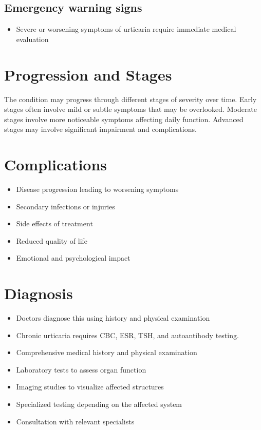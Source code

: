 \subsection{Emergency warning signs}
\begin{itemize}[noitemsep]
  \item Severe or worsening symptoms of urticaria require immediate medical evaluation
\end{itemize}
\section{Progression and Stages}
The condition may progress through different stages of severity over time. Early stages often involve mild or subtle symptoms that may be overlooked. Moderate stages involve more noticeable symptoms affecting daily function. Advanced stages may involve significant impairment and complications.
\section{Complications}
\begin{itemize}[noitemsep]
  \item Disease progression leading to worsening symptoms
  \item Secondary infections or injuries
  \item Side effects of treatment
  \item Reduced quality of life
  \item Emotional and psychological impact
\end{itemize}
\section{Diagnosis}
\begin{itemize}[noitemsep]
  \item Doctors diagnose this using history and physical examination
  \item Chronic urticaria requires CBC, ESR, TSH, and autoantibody testing.
  \item Comprehensive medical history and physical examination
  \item Laboratory tests to assess organ function
  \item Imaging studies to visualize affected structures
  \item Specialized testing depending on the affected system
  \item Consultation with relevant specialists
\end{itemize}
